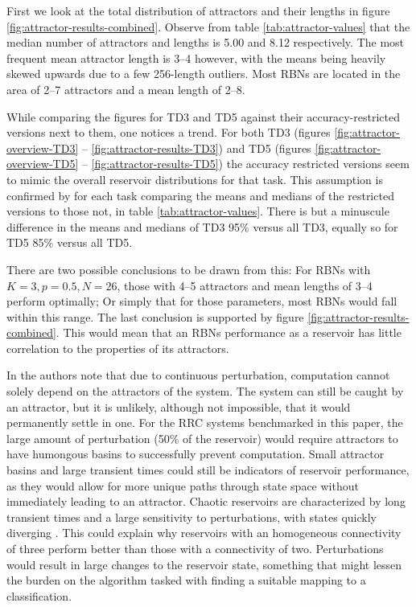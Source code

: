 First we look at the total distribution of attractors and their lengths in figure \ref{fig:attractor-results-combined}.
Observe from table \ref{tab:attractor-values} that the median number of attractors and lengths is 5.00 and 8.12 respectively.
The most frequent mean attractor length is 3--4 however,
with the means being heavily skewed upwards due to a few 256-length outliers.
Most RBNs are located in the area of 2--7 attractors and a mean length of 2--8.

While comparing the figures for TD3 and TD5 against their accuracy-restricted versions next to them,
one notices a trend.
For both TD3 (figures \ref{fig:attractor-overview-TD3} -- \ref{fig:attractor-results-TD3}) and TD5 (figures \ref{fig:attractor-overview-TD5} -- \ref{fig:attractor-results-TD5})
the accuracy restricted versions seem to mimic the overall reservoir distributions for that task.
This assumption is confirmed by for each task comparing the means and medians of the restricted versions to those not,
in table \ref{tab:attractor-values}.
There is but a minuscule difference in the means and medians of TD3 95\% versus all TD3,
equally so for TD5 85\% versus all TD5.

There are two possible conclusions to be drawn from this:
For RBNs with $ K=3, p=0.5, N=26 $,
those with 4--5 attractors and mean lengths of 3--4 perform optimally;
Or simply that for those parameters, most RBNs would fall within this range.
The last conclusion is supported by figure \ref{fig:attractor-results-combined}.
This would mean that an RBNs performance as a reservoir has little correlation to the properties of its attractors.

In \cite{rbn-reservoir} the authors note that due to continuous perturbation,
computation cannot solely depend on the attractors of the system.
The system can still be caught by an attractor,
but it is unlikely,
although not impossible,
that it would permanently settle in one.
For the RRC systems benchmarked in this paper,
the large amount of perturbation (50\% of the reservoir) would require attractors to have humongous basins to successfully prevent computation.
Small attractor basins and large transient times could still be indicators of reservoir performance,
as they would allow for more unique paths through state space without immediately leading to an attractor.
Chaotic reservoirs are characterized by long transient times and a large sensitivity to perturbations,
with states quickly diverging \cite{gershenson2004introduction}.
This could explain why reservoirs with an homogeneous connectivity of three perform better than those with a connectivity of two.
Perturbations would result in large changes to the reservoir state,
something that might lessen the burden on the algorithm tasked with finding a suitable mapping to a classification.
